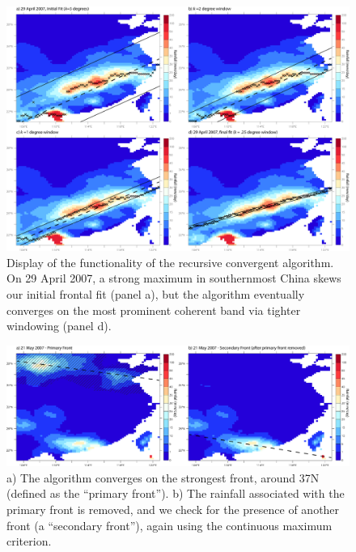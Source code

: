 \documentclass[draft,grl]{agutexSI}
\begin{document}
\begin{article}
\begin{figure}
\noindent\includegraphics[width=36pc]{Figures/S2}
\caption{Display of the functionality of the recursive convergent algorithm. On 29 April 2007, a strong maximum in southernmost China skews our initial frontal fit (panel a), but the algorithm eventually converges on the most prominent coherent band via tighter windowing (panel d).}
\end{figure}

\begin{figure}
\noindent\includegraphics[width=36pc]{Figures/S3}
\caption{a) The algorithm converges on the strongest front, around 37N (defined as the ``primary front''). b) The rainfall associated with the primary front is removed, and we check for the presence of another front (a ``secondary front''), again using the continuous maximum criterion.}
\end{figure}


\end{article}
\end{document}
